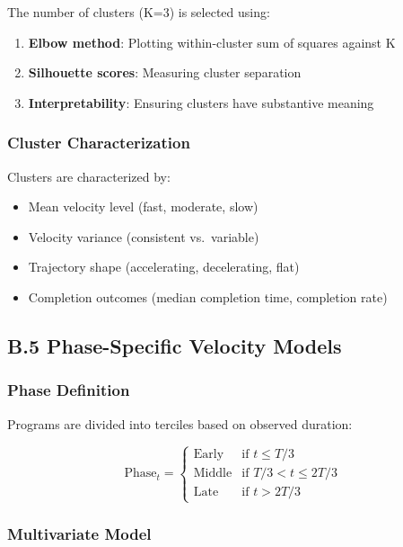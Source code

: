 \documentclass[
  12pt,
  letterpaper,
]{article}
\providecommand{\tightlist}{%
  \setlength{\itemsep}{0pt}\setlength{\parskip}{0pt}}
\begin{document}
The number of clusters (K=3) is selected using:

\begin{enumerate}
\def\labelenumi{\arabic{enumi}.}
\tightlist
\item
  \textbf{Elbow method}: Plotting within-cluster sum of squares against
  K
\item
  \textbf{Silhouette scores}: Measuring cluster separation
\item
  \textbf{Interpretability}: Ensuring clusters have substantive meaning
\end{enumerate}

\subsubsection{Cluster Characterization}\label{cluster-characterization}

Clusters are characterized by:

\begin{itemize}
\tightlist
\item
  Mean velocity level (fast, moderate, slow)
\item
  Velocity variance (consistent vs.~variable)
\item
  Trajectory shape (accelerating, decelerating, flat)
\item
  Completion outcomes (median completion time, completion rate)
\end{itemize}

\subsection{B.5 Phase-Specific Velocity
Models}\label{b.5-phase-specific-velocity-models}

\subsubsection{Phase Definition}\label{phase-definition}

Programs are divided into terciles based on observed duration:

\[
\text{Phase}_t = \begin{cases}
\text{Early} & \text{if } t \leq T/3 \\
\text{Middle} & \text{if } T/3 < t \leq 2T/3 \\
\text{Late} & \text{if } t > 2T/3
\end{cases}
\]

\subsubsection{Multivariate Model}\label{multivariate-model}
\end{document}
